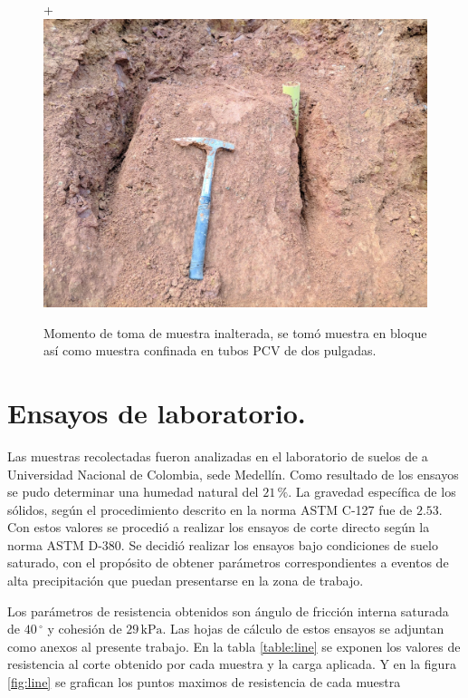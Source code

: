 \begin{figure}[H]+
\centering
\includegraphics[scale=0.20]{img/estacion11.jpg}
\caption{Momento de toma de muestra inalterada, se tom\'o muestra en bloque as\'i como muestra confinada en tubos PCV de dos pulgadas.}
\label{fig:toma-bloque}
\end{figure}

\section{Ensayos de laboratorio.}

Las muestras recolectadas fueron analizadas en el laboratorio de suelos de a Universidad Nacional de Colombia, sede Medell\'in.
Como resultado de los ensayos se pudo determinar una humedad natural del \(21\,\%\).
La gravedad espec\'ifica de los s\'olidos, seg\'un el procedimiento descrito en la norma ASTM C-127 fue de \(2.53\).
Con estos valores se procedi\'o a realizar los ensayos de corte directo seg\'un la norma ASTM D-380. Se decidi\'o realizar los ensayos bajo condiciones de suelo saturado, con el prop\'osito de obtener par\'ametros correspondientes a eventos de alta precipitaci\'on que puedan presentarse en la zona de trabajo.

Los par\'ametros de resistencia obtenidos son \'angulo de fricci\'on interna saturada de \(40\,^\circ\) y cohesi\'on de \(29\,\text{kPa}\). Las hojas de c\'alculo de estos ensayos se adjuntan como anexos al presente trabajo.
En la tabla \ref{table:line}  se exponen los valores de resistencia al corte obtenido por cada muestra  y la carga aplicada. Y en la figura \ref{fig:line} se grafican los puntos maximos de resistencia de cada muestra



